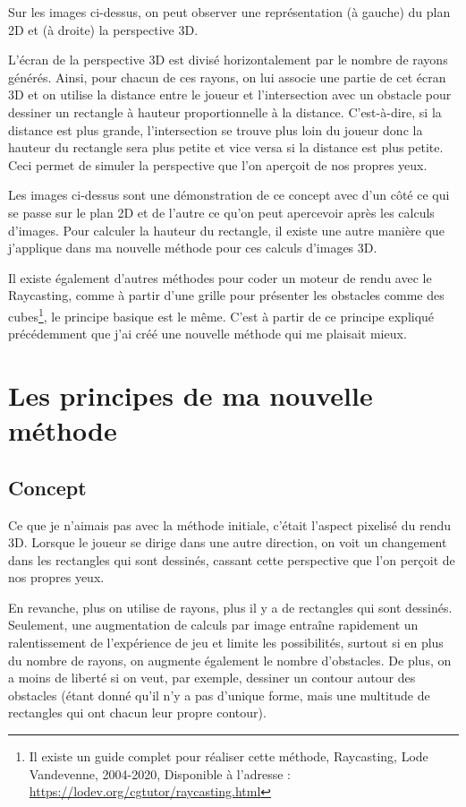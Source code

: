 \documentclass[11pt,french,a4paper,]{article}
\begin{document}
Sur les images ci-dessus, on peut observer une représentation (à gauche)
du plan 2D et (à droite) la perspective 3D.

L'écran de la perspective 3D est divisé horizontalement par le nombre de
rayons générés. Ainsi, pour chacun de ces rayons, on lui associe une
partie de cet écran 3D et on utilise la distance entre le joueur et
l'intersection avec un obstacle pour dessiner un rectangle à hauteur
proportionnelle à la distance. C'est-à-dire, si la distance est plus
grande, l'intersection se trouve plus loin du joueur donc la hauteur du
rectangle sera plus petite et vice versa si la distance est plus petite.
Ceci permet de simuler la perspective que l'on aperçoit de nos propres
yeux.

Les images ci-dessus sont une démonstration de ce concept avec d'un côté
ce qui se passe sur le plan 2D et de l'autre ce qu'on peut apercevoir
après les calculs d'images. Pour calculer la hauteur du rectangle, il
existe une autre manière que j'applique dans ma nouvelle méthode pour
ces calculs d'images 3D.

Il existe également d'autres méthodes pour coder un moteur de rendu avec
le Raycasting, comme à partir d'une grille pour présenter les obstacles
comme des cubes\footnote{Il existe un guide complet pour réaliser cette
  méthode, Raycasting, Lode Vandevenne, 2004-2020, Disponible à
  l'adresse : \url{https://lodev.org/cgtutor/raycasting.html}}, le
principe basique est le même. C'est à partir de ce principe expliqué
précédemment que j'ai créé une nouvelle méthode qui me plaisait mieux.

\hypertarget{les-principes-de-ma-nouvelle-muxe9thode}{%
\section{Les principes de ma nouvelle
méthode}\label{les-principes-de-ma-nouvelle-muxe9thode}}

\hypertarget{concept}{%
\subsection{Concept}\label{concept}}

Ce que je n'aimais pas avec la méthode initiale, c'était l'aspect
pixelisé du rendu 3D. Lorsque le joueur se dirige dans une autre
direction, on voit un changement dans les rectangles qui sont dessinés,
cassant cette perspective que l'on perçoit de nos propres yeux.

En revanche, plus on utilise de rayons, plus il y a de rectangles qui
sont dessinés. Seulement, une augmentation de calculs par image entraîne
rapidement un ralentissement de l'expérience de jeu et limite les
possibilités, surtout si en plus du nombre de rayons, on augmente
également le nombre d'obstacles. De plus, on a moins de liberté si on
veut, par exemple, dessiner un contour autour des obstacles (étant donné
qu'il n'y a pas d'unique forme, mais une multitude de rectangles qui ont
chacun leur propre contour).
\end{document}
